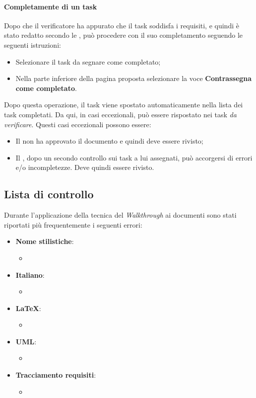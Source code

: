 \paragraph{Completamente di un task}
Dopo che il verificatore ha appurato che il task soddisfa i requisiti, e quindi è stato redatto secondo le
\textsl{\NdP}, può procedere con il suo completamento seguendo le seguenti istruzioni:
\begin{itemize}
  \item Selezionare il task da segnare come completato;
  \item Nella parte inferiore della pagina proposta selezionare la voce \textbf{Contrassegna come 
  completato}.
\end{itemize}
Dopo questa operazione, il task viene spostato automaticamente nella lista dei task completati. Da qui, in
casi eccezionali, può essere rispostato nei task \textsl{da verificare}. Questi casi eccezionali possono essere:
\begin{itemize}
  \item Il \textsl{\RdP} non ha approvato il documento e quindi deve essere 
  rivisto;
  \item Il \textsl{\Ver}, dopo un secondo controllo sui task a lui assegnati, 
  può accorgersi di errori e/o incompletezze. Deve quindi essere rivisto.
\end{itemize}

\subsection{Lista di controllo}
Durante l'applicazione della tecnica del \textit{Walkthrough} ai documenti sono stati riportati 
più frequentemente i seguenti errori:
\begin{itemize}
  \item\textbf{Nome stilistiche}:
  \begin{itemize}
    \item
  \end{itemize}
  
  \item\textbf{Italiano}:
  \begin{itemize}
    \item
  \end{itemize}
  
  \item\textbf{\LaTeX}:
  \begin{itemize}
  \item
  \end{itemize}
  
  \item\textbf{UML}:
  \begin{itemize}
    \item
  \end{itemize}
  
  \item\textbf{Tracciamento requisiti}:
  \begin{itemize}
    \item
  \end{itemize}
\end{itemize}